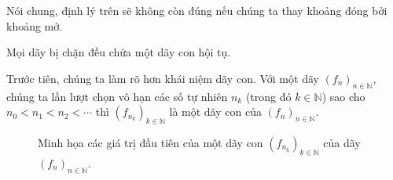 Nói chung, định lý trên sẽ không còn đúng nếu chúng ta thay khoảng đóng bởi khoảng mở.

\begin{appendixthm}
    Mọi dãy bị chặn đều chứa một dãy con hội tụ.
\end{appendixthm}

Trước tiên, chúng ta làm rõ hơn khái niệm dãy con. Với một dãy ${(f_{n})}_{n\in\mathbb{N}}$, chúng ta lần lượt chọn vô hạn các số tự nhiên $n_{k}$ (trong đó $k\in\mathbb{N}$) sao cho $n_{0} < n_{1} < n_{2} < \cdots$ thì ${(f_{n_{k}})}_{k\in\mathbb{N}}$ là một dãy con của ${(f_{n})}_{n\in\mathbb{N}}$.
\begin{figure}[htp]
    \centering
    \caption{Minh họa các giá trị đầu tiên của một dãy con ${(f_{n_{k}})}_{k\in\mathbb{N}}$ của dãy ${(f_{n})}_{n\in\mathbb{N}}$.}
\end{figure}

